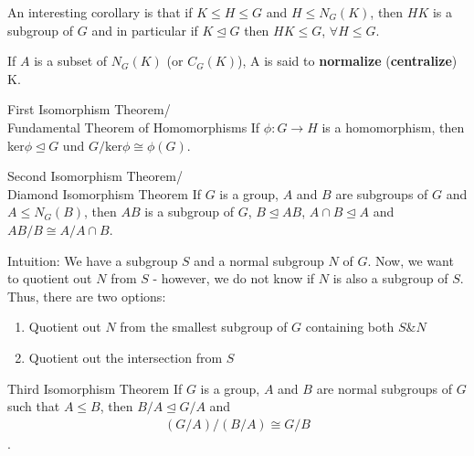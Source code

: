 \documentclass[titlepage, 12pt]{book}
\begin{document}
An interesting corollary is that if $ K \le H \le G$ and
$H\le N_G(K)$, then $HK$ is a subgroup of $G$ and in particular if
$K\trianglelefteq G$ then $HK\le G$, $\forall H\le G$.
\begin{definition}{}{}
    If $A$ is a subset of $N_G(K)$ (or $C_G(K)$), A is said to
    \textbf{normalize} (\textbf{centralize}) K.
\end{definition}
\begin{theorem}{First Isomorphism Theorem/\\Fundamental Theorem of Homomorphisms}{}
    If $\phi:G\rightarrow H$ is a homomorphism, then ker$\phi\trianglelefteq G$
    und $G/\text{ker}\phi\cong \phi(G)$.
\end{theorem}
\begin{theorem}{Second Isomorphism Theorem/\\Diamond Isomorphism Theorem}{}
    If $G$ is a group, $A$ and $B$ are subgroups of $G$ and $A\le N_G(B)$, then
    $AB$ is a subgroup of $G$, $B\trianglelefteq AB$, $A\cap B\trianglelefteq A$
    and $AB/B\cong A/A\cap B$.
\end{theorem}
Intuition: We have a subgroup $S$ and a normal subgroup $N$ of $G$. Now, we want
to quotient out $N$ from $S$ - however, we do not know if $N$ is also a subgroup
of $S$. Thus, there are two options:
\begin{enumerate}
    \item Quotient out $N$ from the smallest subgroup of $G$ containing both
        $S$\&$N$
    \item Quotient out the intersection from $S$
\end{enumerate}
\begin{theorem}{Third Isomorphism Theorem}{}
    If $G$ is a group, $A$ and $B$ are normal subgroups of $G$ such that $A\le
    B$, then $B/A\trianglelefteq G/A$ and 
    \begin{align*}
        (G/A)/(B/A) \cong G/B
    \end{align*}.
\end{theorem}
\end{document}
